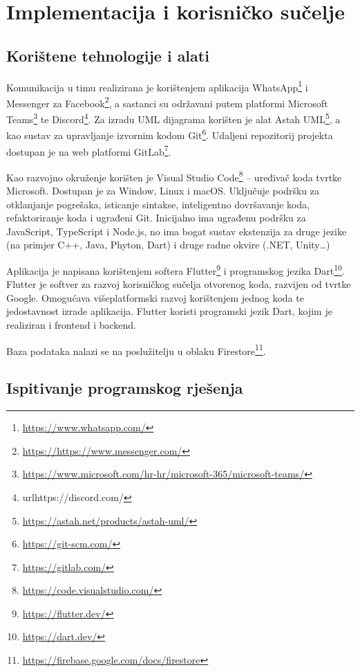 \chapter{Implementacija i korisničko sučelje}
		
		
		\section{Korištene tehnologije i alati}
		
			\text Komunikacija u timu realizirana je korištenjem aplikacija WhatsApp\footnote{\url{https://www.whatsapp.com/}} i Messenger za Facebook\footnote{\url{https://https://www.messenger.com/}}, a sastanci su održavani putem platformi Microsoft Teams\footnote{\url{https://www.microsoft.com/hr-hr/microsoft-365/microsoft-teams/}} te Discord\footnote{url{https://discord.com/}}. Za izradu UML dijagrama korišten je alat Astah UML\footnote{\url{https://astah.net/products/astah-uml/}}, a kao sustav za upravljanje izvornim kodom Git\footnote{\url{https://git-scm.com/}}. Udaljeni repozitorij projekta dostupan je na web platformi GitLab\footnote{\url{https://gitlab.com/}}.
			
			Kao razvojno okruženje korišten je Visual Studio Code\footnote{\url{https://code.visualstudio.com/}} – uređivač koda tvrtke Microsoft. Dostupan je za Window, Linux i macOS. Uključuje podršku za otklanjanje pogrešaka, isticanje sintakse, inteligentno dovršavanje koda, refaktoriranje koda i ugrađeni Git. Inicijalno ima ugrađenu podršku za JavaScript, TypeScript i Node.js, no ima bogat sustav ekstenzija za druge jezike (na primjer C++, Java, Phyton, Dart) i druge radne okvire (.NET, Unity…)
			
			Aplikacija je napisana korištenjem softera Flutter\footnote{\url{https://flutter.dev/}} i programskog jezika Dart\footnote{\url{https://dart.dev/}}. Flutter je softver za razvoj korisničkog sučelja otvorenog koda, razvijen od tvrtke Google. Omogućava višeplatformski razvoj korištenjem jednog koda te jedostavnost izrade aplikacija. Flutter koristi programski jezik Dart, kojim je realiziran i frontend i backend.
			
			Baza podataka nalazi se na poslužitelju u oblaku Firestore\footnote{\url{https://firebase.google.com/docs/firestore}}. 
			
			
			
			\eject 
		
	
		\section{Ispitivanje programskog rješenja}
			
